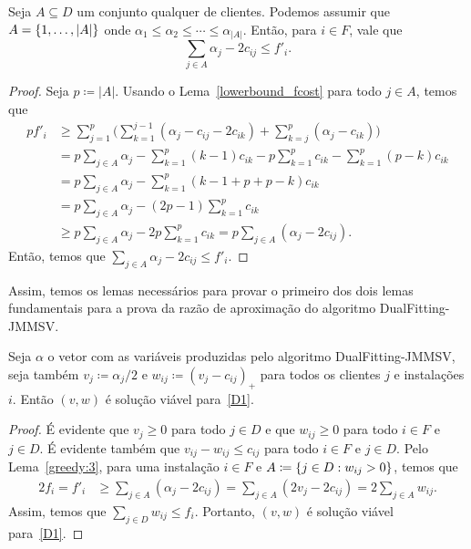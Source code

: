 \begin{lemma}
\label{greedy:3}
Seja $A \subseteq D$ um conjunto qualquer de clientes. Podemos assumir que $A = \{1,\ldots,|A|\}$ onde $\alpha_1 \leq \alpha_2 \leq \cdots \leq \alpha_{|A|}$. Então, para $i \in F$, vale que
\[ \sum_{j \in A}\alpha_j - 2c_{ij} \leq f'_i.
\]
\end{lemma}
\begin{proof}
Seja $p \coloneqq |A|$. Usando o Lema~\ref{lowerbound_fcost} para todo $j \in A$, temos que
\begin{subequations}
\begin{align*}
  p f'_i &\geq \sum_{j=1}^p {\big (} \sum_{k=1}^{j-1} (\alpha_j - c_{ij} - 2c_{ik}) + \sum_{k=j}^p (\alpha_j - c_{ik}) {\big )} \\
  &= p\sum_{j \in A}\alpha_j - \sum_{k=1}^p (k-1)c_{ik} - p\sum_{k=1}^p c_{ik} - \sum_{k=1}^p (p-k) c_{ik} \\
  &= p\sum_{j \in A}\alpha_j - \sum_{k=1}^p (k-1+p+p-k)c_{ik} \\
  &= p\sum_{j \in A}\alpha_j - (2p -1 )\sum_{k=1}^p c_{ik} \\
    &\geq p\sum_{j \in A}\alpha_j - 2p\sum_{k=1}^p c_{ik} = p \sum_{j \in A}( \alpha_j - 2 c_{ij}).
\end{align*}
\end{subequations}
Então, temos que $\sum_{j \in A}\alpha_j - 2c_{ij} \leq f'_i$.
\end{proof}

Assim, temos os lemas necessários para provar o primeiro dos dois lemas fundamentais para a prova da razão de aproximação do algoritmo {\sc DualFitting-JMMSV}.

\begin{lemma}
\label{greedy:4}
Seja $\alpha$ o vetor com as variáveis produzidas pelo algoritmo {\sc DualFitting-JMMSV}, seja também $v_j \coloneqq \alpha_j/2$ e $w_{ij} \coloneqq (v_j - c_{ij})_+$ para todos os clientes $j$ e instalações $i$. Então $(v,w)$ é solução viável para~\eqref{D1}. 
\end{lemma}

\begin{proof}
É evidente que $v_j \geq 0$ para todo $j \in D$ e que $w_{ij} \geq 0$ para todo $i \in F$ e $j \in D$. É evidente também que $v_{ij} - w_{ij} \leq c_{ij}$ para todo $i \in F$ e $j \in D$. Pelo Lema~\ref{greedy:3}, para uma instalação $i\in F$ e $A \coloneqq \{j \in D: w_{ij} > 0\}$, temos que
\begin{align*}
2 f_i = f'_i &\geq \sum_{j \in A} (\alpha_j - 2c_{ij}) = \sum_{j \in A}(2v_j - 2c_{ij}) = 2 \sum_{j \in A} w_{ij}.
\end{align*}
Assim, temos que $\sum_{j \in D} w_{ij} \leq f_i$. Portanto, $(v,w)$ é solução viável para~\eqref{D1}.
\end{proof}


